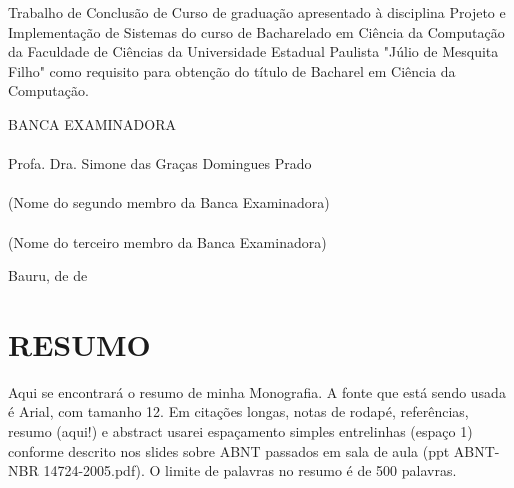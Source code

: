 \documentclass[12pt,a4paper]{article}
\begin{document}
\begin{articleobjective}
	Trabalho de Conclusão de Curso de graduação apresentado à disciplina Projeto e Implementação de Sistemas do curso de Bacharelado em Ciência da Computação da Faculdade de Ciências da Universidade Estadual Paulista "Júlio de Mesquita Filho" como requisito para obtenção do título de Bacharel em Ciência da Computação.
\end{articleobjective}

\begin{center}
	\vspace{1.0cm}
	BANCA EXAMINADORA\\
	
	\vspace{1.0cm}
	\underline{\hspace{8cm}}\\
	Profa. Dra. Simone das Graças Domingues Prado\\
	\vspace{1.0cm}
	\underline{\hspace{8cm}}\\
	(Nome do segundo membro da Banca Examinadora)\\
	\vspace{1.0cm}
	\underline{\hspace{8cm}}\\
	(Nome do terceiro membro da Banca Examinadora)

	\vspace*{\fill} %
	Bauru, \underline{\hspace{1cm}} de \underline{\hspace{3cm}} de \underline{\hspace{1.5cm}}
\end{center}

\clearpage %
\thispagestyle{empty} %
\section*{\hfil RESUMO} %
	\singlespace
	\noindent
	Aqui se encontrará o resumo de minha Monografia.
	A fonte que está sendo usada é Arial, com tamanho 12.
	Em citações longas, notas de rodapé, referências, resumo (aqui!) e abstract usarei espaçamento simples entrelinhas (espaço 1) conforme descrito nos slides sobre ABNT passados em sala de aula (ppt ABNT-NBR 14724-2005.pdf).
	O limite de palavras no resumo é de 500 palavras.
	
\end{document}
